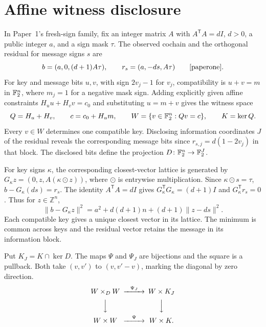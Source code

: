 \section{Affine witness disclosure}
\label{sec:disclosure}

In Paper~1's fresh-sign family, fix an integer matrix \(A\) with
\(A^{\mathsf T}A=dI\), \(d>0\), a public integer \(a\), and a sign mask
\(\tau\). The observed cochain and the orthogonal residual for message
signs \(s\) are
\[
 b=(a,0,(d+1)A\tau),\qquad
 r_s=(a,-ds,A\tau)
 \qquad\text{\cite{paperone}}.
\]
For key and message bits \(u,v\), with sign \(2v_j-1\) for \(v_j\),
compatibility is \(u+v=m\) in \(\mathbb F_2^n\), where \(m_j=1\) for a
negative mask sign. Adding explicitly given affine constraints
\(H_u u+H_v v=c_0\) and substituting \(u=m+v\) gives the witness space
\[
 Q=H_u+H_v,\qquad c=c_0+H_um,\qquad
 W=\{v\in\mathbb F_2^n:Qv=c\},\qquad K=\ker Q .
\]
Every \(v\in W\) determines one compatible key. Disclosing information
coordinates \(J\) of the residual reveals the corresponding message bits
since \(r_{s,j}=d(1-2v_j)\) in that block. The disclosed bits define the
projection \(D\colon\mathbb F_2^n\to\mathbb F_2^J\).

For key signs \(\kappa\), the corresponding closest-vector lattice is
generated by \(G_\kappa z=(0,z,A(\kappa\odot z))\), where \(\odot\) is
entrywise multiplication. Since \(\kappa\odot s=\tau\),
\(b-G_\kappa(ds)=r_s\). The identity \(A^{\mathsf T}A=dI\) gives
\(G_\kappa^{\mathsf T}G_\kappa=(d+1)I\) and
\(G_\kappa^{\mathsf T}r_s=0\). Thus for \(z\in\mathbb Z^n\),
\begin{equation}\label{eq:cvp-cost}
  \|b-G_\kappa z\|^2
    =a^2+d(d+1)n+(d+1)\|z-ds\|^2.
\end{equation}
Each compatible key gives a unique closest vector in its lattice. The
minimum is common across keys and the residual vector retains the
message in its information block.

\begin{proposition}\label{prop:disclosure}
Put \(K_J=K\cap\ker D\). The maps \(\Psi\) and \(\Psi_J\) are bijections
and the square is a pullback. Both take \((v,v')\) to \((v,v'-v)\), marking
the diagonal by zero direction.
\begin{equation}\label{eq:disclosure}
\begin{CD}
  W\times_D W @>{\Psi_J}>> W\times K_J\\
  @VVV @VVV\\
  W\times W @>{\Psi}>> W\times K .
\end{CD}
\end{equation}
\end{proposition}

